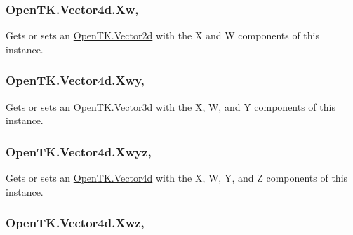\hypertarget{struct_open_t_k_1_1_vector4d_ac51d6b06d0055c5fdb454ef012693062}{
\subsubsection[{Xw}]{ Open\-T\-K.\-Vector4d.\-Xw\hspace{0.3cm}{\ttfamily [get]}, {\ttfamily [set]}}}\label{struct_open_t_k_1_1_vector4d_ac51d6b06d0055c5fdb454ef012693062}


Gets or sets an \hyperlink{struct_open_t_k_1_1_vector2d}{Open\-T\-K.\-Vector2d} with the X and W components of this instance. 

\hypertarget{struct_open_t_k_1_1_vector4d_a0573f433a094655e758c3b6286069936}{
\subsubsection[{Xwy}]{ Open\-T\-K.\-Vector4d.\-Xwy\hspace{0.3cm}{\ttfamily [get]}, {\ttfamily [set]}}}\label{struct_open_t_k_1_1_vector4d_a0573f433a094655e758c3b6286069936}


Gets or sets an \hyperlink{struct_open_t_k_1_1_vector3d}{Open\-T\-K.\-Vector3d} with the X, W, and Y components of this instance. 

\hypertarget{struct_open_t_k_1_1_vector4d_abf4e9988c0495a9a8eee3c6068368719}{
\subsubsection[{Xwyz}]{ Open\-T\-K.\-Vector4d.\-Xwyz\hspace{0.3cm}{\ttfamily [get]}, {\ttfamily [set]}}}\label{struct_open_t_k_1_1_vector4d_abf4e9988c0495a9a8eee3c6068368719}


Gets or sets an \hyperlink{struct_open_t_k_1_1_vector4d}{Open\-T\-K.\-Vector4d} with the X, W, Y, and Z components of this instance. 

\hypertarget{struct_open_t_k_1_1_vector4d_a16554fa9c3a037fcc74dab63f5e1879f}{
\subsubsection[{Xwz}]{ Open\-T\-K.\-Vector4d.\-Xwz\hspace{0.3cm}{\ttfamily [get]}, {\ttfamily [set]}}}\label{struct_open_t_k_1_1_vector4d_a16554fa9c3a037fcc74dab63f5e1879f}


